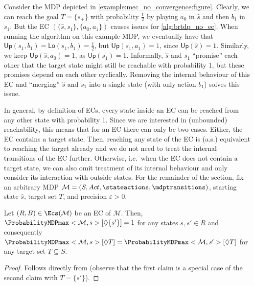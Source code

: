 \documentclass{article}
\newcommand{\MDP}{\mathcal{M}}
\newcommand{\States}{S}
\newcommand{\initialstate}{\hat{s}}
\newcommand{\Actions}{Act}
\newcommand{\reach}{\Diamond}
\newcommand{\upperbound}{\mathsf{Up}}
\newcommand{\lowerbound}{\mathsf{Lo}}
\newcommand{\targetstate}{s_+}
\newcommand{\targetset}{T}
\begin{document}
\begin{example} \label{example:mec_no_convergence}
	Consider the MDP depicted in \cref{example:mec_no_convergence:figure}.
	Clearly, we can reach the goal $\targetset = \{\targetstate\}$ with probability $\frac{1}{2}$ by playing $a_0$ in $\initialstate$ and then $b_1$ in $s_1$.
	But the EC $(\{\initialstate, s_1\}, \{a_0, a_1\})$ causes issues for \cref{alg:brtdp_no_ec}.
	When running the algorithm on this example MDP, we eventually have that $\upperbound(s_1, b_1) = \lowerbound(s_1, b_1) = \frac{1}{2}$, but $\upperbound(s_1, a_1) = 1$, since $\upperbound(\initialstate) = 1$.
	Similarly, we keep $\upperbound(\initialstate, a_0) = 1$, as $\upperbound(s_1) = 1$.
	Informally, $\initialstate$ and $s_1$ \enquote{promise} each other that the target state might still be reachable with probability 1, but these promises depend on each other cyclically.
	Removing the internal behaviour of this EC and \enquote{merging} $\initialstate$ and $s_1$ into a single state (with only action $b_1$) solves this issue.
\end{example}
In general, by definition of ECs, every state inside an EC can be reached from any other state with probability 1.
Since we are interested in (unbounded) reachability, this means that for an EC there can only be two cases.
Either, the EC contains a target state.
Then, reaching any state of the EC is (a.s.) equivalent to reaching the target already and we do not need to treat the internal transitions of the EC further.
Otherwise, i.e.\ when the EC does not contain a target state, we can also omit treatment of its internal behaviour and only consider its interaction with outside states.
For the remainder of the section, fix an arbitrary MDP $\MDP = (\States, \Actions, \stateactions, \mdptransitions)$, starting state $\initialstate$, target set $\targetset$, and precision $\varepsilon > 0$.
\begin{lemma} \label{stm:ec_same_value}
	Let $(R, B) \in \Ecs(\MDP)$ be an EC of $\MDP$.
	Then, $\ProbabilityMDPmax<\MDP,s>[\reach \{s'\}] = 1$ for any states $s, s' \in R$ and consequently $\ProbabilityMDPmax<\MDP,s>[\reach \targetset] = \ProbabilityMDPmax<\MDP,s'>[\reach \targetset]$ for any target set $\targetset \subseteq \States$.
\end{lemma}

\begin{proof}
	Follows directly from \cite[Lemma~1]{DBLP:conf/qest/CiesinskiBGK08} (observe that the first claim is a special case of the second claim with $\targetset = \{s'\}$). 
\end{proof}
\end{document}
